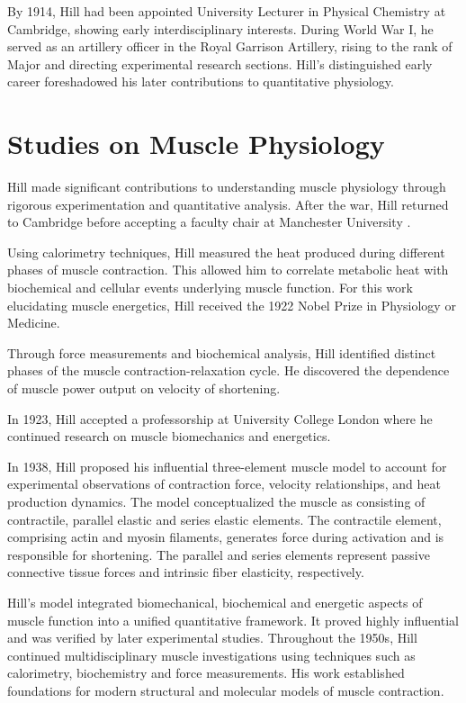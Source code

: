 By 1914, Hill had been appointed University Lecturer in Physical Chemistry at Cambridge, showing early interdisciplinary interests. During World War I, he served as an artillery officer in the Royal Garrison Artillery, rising to the rank of Major and directing experimental research sections. Hill's distinguished early career foreshadowed his later contributions to quantitative physiology.

\section{Studies on Muscle Physiology}

Hill made significant contributions to understanding muscle physiology through rigorous experimentation and quantitative analysis. After the war, Hill returned to Cambridge before accepting a faculty chair at Manchester University \citep{Bassett2002}.

Using calorimetry techniques, Hill measured the heat produced during different phases of muscle contraction. This allowed him to correlate metabolic heat with biochemical and cellular events underlying muscle function. For this work elucidating muscle energetics, Hill received the 1922 Nobel Prize in Physiology or Medicine.

Through force measurements and biochemical analysis, Hill identified distinct phases of the muscle contraction-relaxation cycle. He discovered the dependence of muscle power output on velocity of shortening.

In 1923, Hill accepted a professorship at University College London where he continued research on muscle biomechanics and energetics. 

In 1938, Hill proposed his influential three-element muscle model to account for experimental observations of contraction force, velocity relationships, and heat production dynamics. The model conceptualized the muscle as consisting of contractile, parallel elastic and series elastic elements. The contractile element, comprising actin and myosin filaments, generates force during activation and is responsible for shortening. The parallel and series elements represent passive connective tissue forces and intrinsic fiber elasticity, respectively.

Hill's model integrated biomechanical, biochemical and energetic aspects of muscle function into a unified quantitative framework. It proved highly influential and was verified by later experimental studies. Throughout the 1950s, Hill continued multidisciplinary muscle investigations using techniques such as calorimetry, biochemistry and force measurements. His work established foundations for modern structural and molecular models of muscle contraction.

